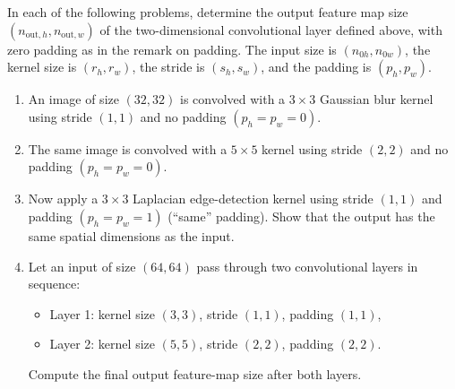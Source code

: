 \begin{problem}
In each of the following problems, determine the output feature map size $(n_{\text{out},h}, n_{\text{out},w})$ of the two-dimensional convolutional layer defined above, with zero padding as in the remark on padding. The input size is $(n_{0h}, n_{0w})$, the kernel size is $(r_h, r_w)$, the stride is $(s_h, s_w)$, and the padding is $(p_h, p_w)$.

\begin{enumerate}
\item
An image of size $(32, 32)$ is convolved with a $3\times3$ Gaussian blur kernel
using stride $(1, 1)$ and no padding $(p_h = p_w = 0)$.

\item
The same image is convolved with a $5\times5$ kernel
using stride $(2, 2)$ and no padding $(p_h = p_w = 0)$.

\item
Now apply a $3\times3$ Laplacian edge-detection kernel
using stride $(1, 1)$ and padding $(p_h = p_w = 1)$ (“same” padding).
Show that the output has the same spatial dimensions as the input.

\item
Let an input of size $(64, 64)$ pass through two convolutional layers in sequence:
\begin{itemize}
\item Layer 1: kernel size $(3, 3)$, stride $(1, 1)$, padding $(1, 1)$,
\item Layer 2: kernel size $(5, 5)$, stride $(2, 2)$, padding $(2, 2)$.
\end{itemize}
Compute the final output feature-map size after both layers.
\end{enumerate}
\end{problem}


